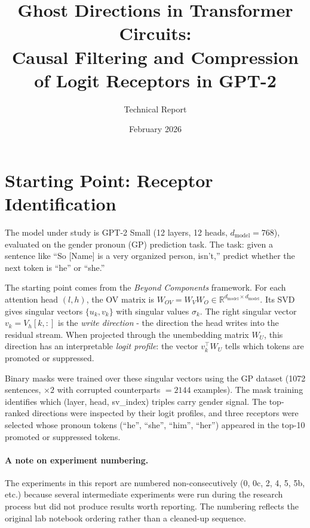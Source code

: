 \documentclass[11pt,a4paper]{article}
\title{Ghost Directions in Transformer Circuits:\\Causal Filtering and Compression of Logit Receptors in GPT-2}
\author{Technical Report}
\date{February 2026}
\begin{document}
\maketitle
\tableofcontents
\newpage

\section{Starting Point: Receptor Identification}
\label{sec:setup}

The model under study is GPT-2 Small (12 layers, 12 heads, $d_\text{model}=768$), evaluated on the gender pronoun (GP) prediction task. The task: given a sentence like ``So [Name] is a very organized person, isn't,'' predict whether the next token is ``he'' or ``she.''

The starting point comes from the \emph{Beyond Components} framework. For each attention head $(l,h)$, the OV matrix is $W_{OV} = W_V W_O \in \mathbb{R}^{d_\text{model}\times d_\text{model}}$. Its SVD gives singular vectors $\{u_k, v_k\}$ with singular values $\sigma_k$. The right singular vector $v_k = V_h[k,:]$ is the \emph{write direction} - the direction the head writes into the residual stream. When projected through the unembedding matrix $W_U$, this direction has an interpretable \emph{logit profile}: the vector $v_k^\top W_U$ tells which tokens are promoted or suppressed.

Binary masks were trained over these singular vectors using the GP dataset (1072 sentences, $\times 2$ with corrupted counterparts $= 2144$ examples). The mask training identifies which (layer, head, sv\_index) triples carry gender signal. The top-ranked directions were inspected by their logit profiles, and three receptors were selected whose pronoun tokens (``he'', ``she'', ``him'', ``her'') appeared in the top-10 promoted or suppressed tokens.

\paragraph{A note on experiment numbering.} The experiments in this report are numbered non-consecutively (0, 0c, 2, 4, 5, 5b, etc.) because several intermediate experiments were run during the research process but did not produce results worth reporting. The numbering reflects the original lab notebook ordering rather than a cleaned-up sequence.
\end{document}

